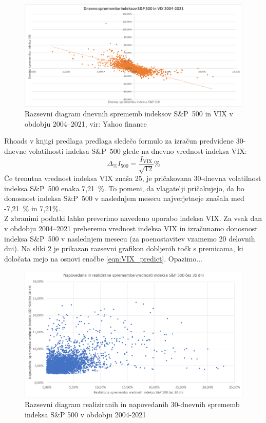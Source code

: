 \documentclass[12pt,a4paper, reqno]{amsart}
\theoremstyle{definition} %
\theoremstyle{plain} %
\begin{document}
\begin{figure}[!h]
\centering
\includegraphics[width = 15 cm]{Grafi/VIX_SPX_correlation.png}
\caption{Razsevni diagram dnevnih sprememb indeksov S\&P~500 in VIX v obdobju 2004--2021, vir: Yahoo finance}
\label{Graf 3}
\end{figure}


Rhoads v knjigi \cite{rhoads} predlaga predlaga sledečo formulo za izračun predvidene 30-dnevne volatilnosti indeksa S\&P~500 glede na dnevno vrednost indeksa VIX:
\begin{equation}
\label{eqn:VIX_predict}
\Delta_\% I_{500} = \frac{I_\text{VIX}}{\sqrt{12}}\%
\end{equation}
Če trenutna vrednost indeksa VIX znaša 25, je pričakovana 30-dnevna volatilnost indeksa S\&P~500 enaka 7,21~\%. To pomeni, da vlagatelji pričakujejo, da bo donosnost indeksa S\&P~500 v naslednjem mesecu najverjetneje znašala med -7,21~\% in 7,21\%.\\

Z zbranimi podatki lahko preverimo navedeno uporabo indeksa VIX. Za vsak dan v obdobju 2004--2021 preberemo vrednost indeksa VIX in izračunamo donosnost indeksa S\&P~500 v naslednjem mesecu (za poenostavitev vzamemo 20 delovnih dni). Na sliki \ref{Graf 9} je prikazan razsevni grafikon dobljenih točk s premicama, ki določata mejo na osnovi enačbe \ref{eqn:VIX_predict}. Opazimo...

\begin{figure}[!h]
\centering
\includegraphics[width = 15 cm]{Grafi/SPX_prediction_with_VIX.png}
\caption{Razsevni diagram realiziranih in napovedanih 30-dnevnih sprememb indeksa S\&P 500 v obdobju 2004-2021}
\label{Graf 9}
\end{figure}
\end{document}
